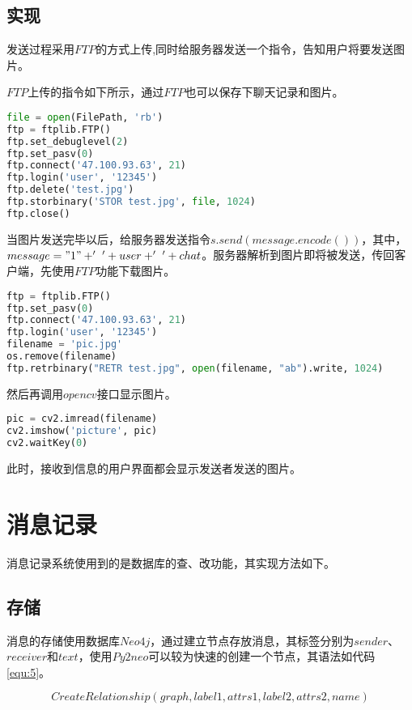 \documentclass[forprint]{sql}
\begin{document}
\subsection{实现}

发送过程采用$FTP$的方式上传,同时给服务器发送一个指令，告知用户将要发送图片。

$FTP$上传的指令如下所示，通过$FTP$也可以保存下聊天记录和图片。

\begin{lstlisting}[language=Python]
file = open(FilePath, 'rb')
ftp = ftplib.FTP()
ftp.set_debuglevel(2)
ftp.set_pasv(0)
ftp.connect('47.100.93.63', 21)
ftp.login('user', '12345')
ftp.delete('test.jpg')
ftp.storbinary('STOR test.jpg', file, 1024)
ftp.close()
\end{lstlisting}

当图片发送完毕以后，给服务器发送指令$s.send(message.encode())$，其中，$message = "1" + '~' + user + '~' + chat$。服务器解析到图片即将被发送，传回客户端，先使用$FTP$功能下载图片。

\begin{lstlisting}[language=Python]
ftp = ftplib.FTP()
ftp.set_pasv(0)
ftp.connect('47.100.93.63', 21)
ftp.login('user', '12345')
filename = 'pic.jpg'
os.remove(filename)
ftp.retrbinary("RETR test.jpg", open(filename, "ab").write, 1024)
\end{lstlisting}

然后再调用$opencv$接口显示图片。

\begin{lstlisting}[language=Python]
pic = cv2.imread(filename)
cv2.imshow('picture', pic)
cv2.waitKey(0)
\end{lstlisting}

此时，接收到信息的用户界面都会显示发送者发送的图片。

\section{消息记录}

消息记录系统使用到的是数据库的查、改功能，其实现方法如下。

\subsection{存储}

消息的存储使用数据库$Neo4j$，通过建立节点存放消息，其标签分别为$sender$、$receiver$和$text$，使用$Py2neo$可以较为快速的创建一个节点，其语法如代码\ref{equ:5}。

\begin{equation}
	\label{equ:5}
	CreateRelationship(graph, label1, attrs1, label2, attrs2, name)
\end{equation}
\end{document}
